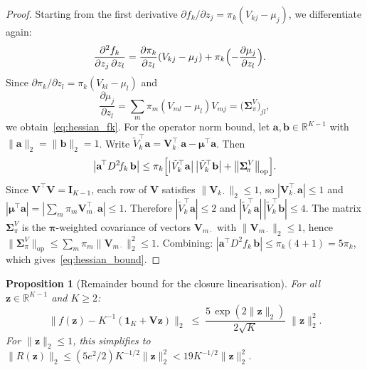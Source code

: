 \documentclass{article}
\newtheorem{proposition}[theorem]{Proposition}
\begin{document}
\begin{proof}
Starting from the first derivative
$\partial f_k/\partial z_j = \pi_k(V_{kj}-\mu_j)$,
we differentiate again:
\begin{align*}
  \frac{\partial^2 f_k}{\partial z_j\,\partial z_l}
  &= \frac{\partial\pi_k}{\partial z_l}(V_{kj}-\mu_j)
     + \pi_k\Bigl(-\frac{\partial\mu_j}{\partial z_l}\Bigr).
\end{align*}
Since $\partial\pi_k/\partial z_l = \pi_k(V_{kl}-\mu_l)$ and
\[
  \frac{\partial\mu_j}{\partial z_l}
  = \sum_m \pi_m(V_{ml}-\mu_l)V_{mj}
  = \bigl(\boldsymbol{\Sigma}_{\!\pi}^V\bigr)_{\!jl},
\]
we obtain~\eqref{eq:hessian_fk}. For the operator norm bound, let
$\mathbf{a},\mathbf{b}\in\mathbb{R}^{K-1}$ with $\|\mathbf{a}\|_2
=\|\mathbf{b}\|_2=1$. Write
$\tilde{V}_{k}^{\!\top}\mathbf{a}
= \mathbf{V}_{k\cdot}^{\!\top}\mathbf{a}
  - \boldsymbol{\mu}^{\!\top}\mathbf{a}$.
Then
\[
  \bigl|\mathbf{a}^{\!\top}D^2\!f_k\,\mathbf{b}\bigr|
  \leq \pi_k\Bigl[
    \bigl|\tilde{V}_{k}^{\!\top}\mathbf{a}\bigr|\,
    \bigl|\tilde{V}_{k}^{\!\top}\mathbf{b}\bigr|
    + \bigl\|\boldsymbol{\Sigma}_{\!\pi}^V\bigr\|_{\mathrm{op}}
  \Bigr].
\]
Since $\mathbf{V}^{\!\top}\mathbf{V}=\mathbf{I}_{K-1}$, each row of
$\mathbf{V}$ satisfies $\|\mathbf{V}_{k\cdot}\|_2\leq 1$, so
$|\mathbf{V}_{k\cdot}^{\!\top}\mathbf{a}|\leq 1$ and
$|\boldsymbol{\mu}^{\!\top}\mathbf{a}|
= |\sum_m \pi_m \mathbf{V}_{m\cdot}^{\!\top}\mathbf{a}| \leq 1$.
Therefore $|\tilde{V}_k^{\!\top}\mathbf{a}|\leq 2$ and
$|\tilde{V}_k^{\!\top}\mathbf{a}|\,|\tilde{V}_k^{\!\top}\mathbf{b}|
\leq 4$.
The matrix $\boldsymbol{\Sigma}_{\!\pi}^V$ is the
$\boldsymbol{\pi}$-weighted covariance of vectors
$\mathbf{V}_{m\cdot}$ with $\|\mathbf{V}_{m\cdot}\|_2\leq 1$,
hence $\|\boldsymbol{\Sigma}_{\!\pi}^V\|_{\mathrm{op}}
\leq \sum_m\pi_m\|\mathbf{V}_{m\cdot}\|_2^2 \leq 1$.
Combining: $|\mathbf{a}^{\!\top}D^2\!f_k\,\mathbf{b}| \leq
\pi_k(4+1) = 5\pi_k$,
which gives~\eqref{eq:hessian_bound}.
\end{proof}

\begin{proposition}[Remainder bound for the closure linearisation]
\label{prop:remainder}
For all $\mathbf{z}\in\mathbb{R}^{K-1}$ and $K\geq 2$:
\begin{equation}
  \bigl\|
    f(\mathbf{z}) - K^{-1}(\mathbf{1}_K + \mathbf{V}\mathbf{z})
  \bigr\|_2
  \;\leq\;
  \frac{5\,\exp(2\|\mathbf{z}\|_2)}{2\sqrt{K}}
  \;\|\mathbf{z}\|_2^2.
  \label{eq:remainder_bound}
\end{equation}
For $\|\mathbf{z}\|_2\leq 1$, this simplifies to
$\|R(\mathbf{z})\|_2 \leq (5e^2/2) K^{-1/2}\|\mathbf{z}\|_2^2
 < 19 K^{-1/2}\|\mathbf{z}\|_2^2$.
\end{proposition}
\end{document}
